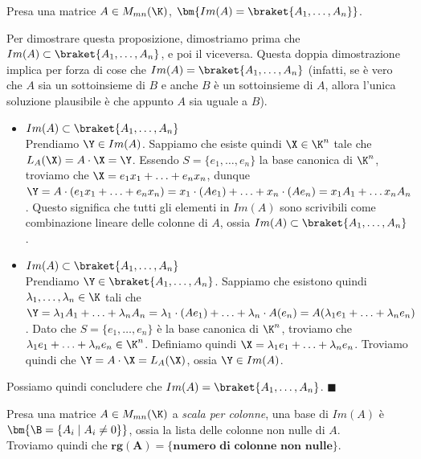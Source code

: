 \documentclass[11pt, a4paper, titlepage, oneside]{scrbook}
\begin{document}
\begin{Proposizione}[]
\label{propos-immagine-combinazione-lineare-colonne}
Presa una matrice $A \in M_{mn}(\K)$, $\bm{Im(A) = \braket{A_1, \ldots, A_n}}$.
\end{Proposizione}

\Dimostrazione \nopagebreak

Per dimostrare questa proposizione, dimostriamo prima che $Im(A) \subset \braket{A_1, \ldots, A_n}$, e poi il viceversa. Questa doppia dimostrazione implica per forza di cose che $Im(A) = \braket{A_1, \ldots, A_n}$ (infatti, se è vero che $A$ sia un sottoinsieme di $B$ e anche $B$ è un sottoinsieme di $A$, allora l'unica soluzione plausibile è che appunto $A$ sia uguale a $B$).
\begin{itemize}
    \item $Im(A) \subset \braket{A_1, \ldots, A_n}$ \\
    Prendiamo $\Y \in Im(A)$. Sappiamo che esiste quindi $\X \in \K^n$ tale che $L_A(\X) = A \cdot \X = \Y$. Essendo $S = \{e_1, \ldots, e_n\}$ la base canonica di $\K^n$, troviamo che $\X = e_1 x_1 + \ldots + e_n x_n$, dunque $\Y = A \cdot (e_1 x_1 + \ldots + e_n x_n) = x_1 \cdot (A e_1) + \ldots + x_n \cdot (A e_n) = x_1 A_1 + \ldots x_n A_n$. Questo significa che tutti gli elementi in $Im(A)$ sono scrivibili come combinazione lineare delle colonne di $A$, ossia $Im(A) \subset \braket{A_1, \ldots, A_n}$.
    \item $Im(A) \subset \braket{A_1, \ldots, A_n}$ \\
    Prendiamo $\Y \in \braket{A_1, \ldots, A_n}$. Sappiamo che esistono quindi $\lambda_1, \ldots, \lambda_n \in \K$ tali che $\Y = \lambda_1 A_1 + \ldots + \lambda_n A_n = \lambda_1 \cdot (A e_1) + \ldots + \lambda_n \cdot A(e_n) = A (\lambda_1 e_1 + \ldots + \lambda_n e_n)$. Dato che $S = \{e_1, \ldots, e_n\}$ è la base canonica di $\K^n$, troviamo che $\lambda_1 e_1 + \ldots + \lambda_n e_n \in \K^n$. Definiamo quindi $\X = \lambda_1 e_1 + \ldots + \lambda_n e_n$. Troviamo quindi che $\Y = A \cdot \X = L_A(\X)$, ossia $\Y \in Im(A)$. 
\end{itemize}
Possiamo quindi concludere che $Im(A) = \braket{A_1, \ldots, A_n}$. $\blacksquare$

\begin{Proposizione}[]
\label{propos-base-immagine-lista-colonna-non-nulle}
Presa una matrice $A \in M_{mn}(\K)$ a \textit{scala per colonne}, una base di $Im(A)$ è $\bm{\B = \{A_i \mid A_i \neq 0\}}$, ossia la lista delle colonne non nulle di $A$. \\
Troviamo quindi che $\bm{rg(A) = \{\textbf{numero di colonne non nulle}\}}$.
\end{Proposizione}
\end{document}
